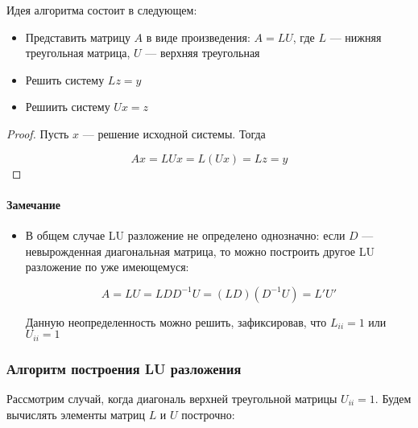 Идея алгоритма состоит в следующем:

\begin{itemize}
    \item Представить матрицу $A$ в виде произведения: $A = LU$, где $L$ --- нижняя треугольная матрица, $U$ --- верхняя треугольная
    \item Решить систему $Lz = y$
    \item Решиить систему $Ux = z$
\end{itemize}

\begin{proof}
    Пусть $x$ --- решение исходной системы. Тогда

    \[
    Ax = LUx = L(Ux) = Lz = y
    \]
\end{proof}

\paragraph{Замечание}

\begin{itemize}
    \item В общем случае LU разложение не определено однозначно: если $D$ --- невырожденная диагональная матрица, то можно построить другое LU разложение по уже имеющемуся:

    \[
    A = LU = LDD^{-1}U = (LD)(D^{-1}U) = L'U'
    \]

    Данную неопределенность можно решить, зафиксировав, что $L_{ii} = 1$ или $U_{ii} = 1$
\end{itemize}

\subsubsection*{Алгоритм построения LU разложения}

Рассмотрим случай, когда диагональ верхней треугольной матрицы $U_{ii} = 1$. Будем вычислять элементы матриц $L$ и $U$ построчно:

